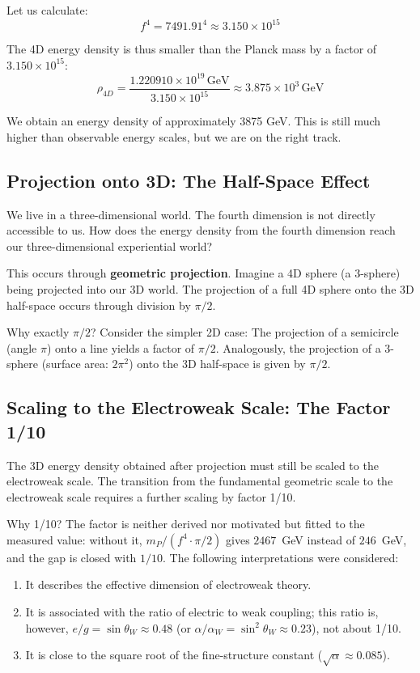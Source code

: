 	Let us calculate:
	\begin{equation}
		f^4 = 7491.91^4 \approx 3.150 \times 10^{15}
	\end{equation}
	
	The 4D energy density is thus smaller than the Planck mass by a factor of \(3.150 \times 10^{15}\):
	\begin{equation}
		\rho_{4D} = \frac{1.220910 \times 10^{19}\,\text{GeV}}{3.150 \times 10^{15}} \approx 3.875 \times 10^{3}\,\text{GeV}
	\end{equation}
	
	We obtain an energy density of approximately 3875 GeV. This is still much higher than observable energy scales, but we are on the right track.
	
	\subsection{Projection onto 3D: The Half-Space Effect}
	
	We live in a three-dimensional world. The fourth dimension is not directly accessible to us. How does the energy density from the fourth dimension reach our three-dimensional experiential world?
	
	This occurs through \textbf{geometric projection}. Imagine a 4D sphere (a 3-sphere) being projected into our 3D world. The projection of a full 4D sphere onto the 3D half-space occurs through division by \(\pi/2\).
	
	Why exactly \(\pi/2\)? Consider the simpler 2D case: The projection of a semicircle (angle \(\pi\)) onto a line yields a factor of \(\pi/2\). Analogously, the projection of a 3-sphere (surface area: \(2\pi^2\)) onto the 3D half-space is given by \(\pi/2\).
	
	\subsection{Scaling to the Electroweak Scale: The Factor 1/10}
	
	The 3D energy density obtained after projection must still be scaled to the electroweak scale. The transition from the fundamental geometric scale to the electroweak scale requires a further scaling by factor 1/10.
	
	Why 1/10? The factor is neither derived nor motivated but fitted to the measured value: without it, $m_P/(f^4\cdot\pi/2)$ gives $2467$~GeV instead of $246$~GeV, and the gap is closed with $1/10$. The following interpretations were considered:
	\begin{enumerate}
		\item It describes the effective dimension of electroweak theory.
		\item It is associated with the ratio of electric to weak coupling; this ratio is, however, $e/g = \sin\theta_W \approx 0.48$ (or $\alpha/\alpha_W = \sin^2\theta_W \approx 0.23$), not about 1/10.
		\item It is close to the square root of the fine-structure constant (\(\sqrt{\alpha} \approx 0.085\)).
	\end{enumerate}

